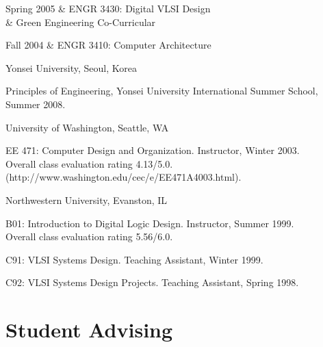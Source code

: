 \documentclass[line]{res}
\newenvironment{list1}{
  \begin{list}{\ding{113}}{%
      \setlength{\itemsep}{0in}
      \setlength{\parsep}{0in} \setlength{\parskip}{0in}
      \setlength{\topsep}{0in} \setlength{\partopsep}{0in} 
      \setlength{\leftmargin}{0.17in}}}{\end{list}}
\begin{document}
\begin{resume}
\begin{enumerate}
\begin{longtable}
			Spring 2005 & ENGR 3430: Digital VLSI Design \\
			& Green Engineering Co-Curricular \\
			\hline
			
			Fall 2004 & ENGR 3410: Computer Architecture \\
			\hline
		\end{longtable}
		
		\item Yonsei University, Seoul, Korea\\
		\vspace{-.1in} 
		\begin{list1}
			\item[] Principles of Engineering, Yonsei University International Summer School, Summer 2008. 
		\end{list1}
		
		\item University of Washington, Seattle, WA\\
		\vspace{-.1in} 
		\begin{list1}
			\item[] EE 471: Computer Design and Organization. Instructor, Winter 2003.\\
			Overall class evaluation rating 4.13/5.0.\\
			(http://www.washington.edu/cec/e/EE471A4003.html). 
		\end{list1}
		
		\item Northwestern University, Evanston, IL\\
		\vspace{-.1in} 
		\begin{list1}
			\item[] B01: Introduction to Digital Logic Design. Instructor, Summer 1999.\\
			Overall class evaluation rating 5.56/6.0. 
			\item[] C91: VLSI Systems Design. Teaching Assistant, Winter 1999. 
			\item[] C92: VLSI Systems Design Projects. Teaching Assistant, Spring 1998. 
		\end{list1}
	\end{enumerate}
	
	\section{\sc Student Advising}
	

\end{resume}
\end{document}
